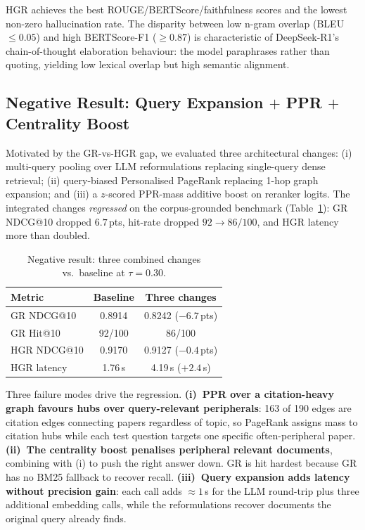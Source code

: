 \documentclass[journal]{IEEEtran}
\begin{document}
HGR achieves the best ROUGE/BERTScore/faithfulness scores and the
lowest non-zero hallucination rate. The disparity between low
n-gram overlap (BLEU $\leq 0.05$) and high BERTScore-F1 ($\geq 0.87$)
is characteristic of DeepSeek-R1's chain-of-thought elaboration
behaviour: the model paraphrases rather than quoting, yielding low
lexical overlap but high semantic alignment.

\subsection{Negative Result: Query Expansion $+$ PPR $+$ Centrality Boost}
\label{sec:ppr-fail}
Motivated by the GR-vs-HGR gap, we evaluated three architectural
changes: (i) multi-query pooling over LLM reformulations replacing
single-query dense retrieval; (ii) query-biased Personalised PageRank
replacing 1-hop graph expansion; and (iii) a $z$-scored PPR-mass
additive boost on reranker logits. The integrated changes
\emph{regressed} on the corpus-grounded benchmark
(Table~\ref{tab:negative}): GR NDCG@10 dropped $6.7$\,pts, hit-rate
dropped $92\!\to\!86/100$, and HGR latency more than doubled.

\begin{table}[!t]
\centering
\caption{Negative result: three combined changes vs.\ baseline at $\tau=0.30$.}
\label{tab:negative}
\footnotesize
\setlength{\tabcolsep}{4pt}
\begin{tabular}{@{}lcc@{}}
\toprule
\textbf{Metric} & \textbf{Baseline} & \textbf{Three changes} \\
\midrule
GR NDCG@10  & 0.8914 & 0.8242 ($-6.7$\,pts) \\
GR Hit@10   & 92/100 & 86/100 \\
HGR NDCG@10 & 0.9170 & 0.9127 ($-0.4$\,pts) \\
HGR latency & 1.76\,s & 4.19\,s ($+2.4$\,s) \\
\bottomrule
\end{tabular}
\end{table}

Three failure modes drive the regression. \textbf{(i)~PPR over a
citation-heavy graph favours hubs over query-relevant peripherals}:
163 of 190 edges are citation edges connecting papers regardless of
topic, so PageRank assigns mass to citation hubs while each test
question targets one specific often-peripheral paper.
\textbf{(ii)~The centrality boost penalises peripheral relevant
documents}, combining with (i) to push the right answer down. GR is
hit hardest because GR has no BM25 fallback to recover recall.
\textbf{(iii)~Query expansion adds latency without precision gain}:
each call adds $\approx 1$\,s for the LLM round-trip plus three
additional embedding calls, while the reformulations recover
documents the original query already finds.
\end{document}

